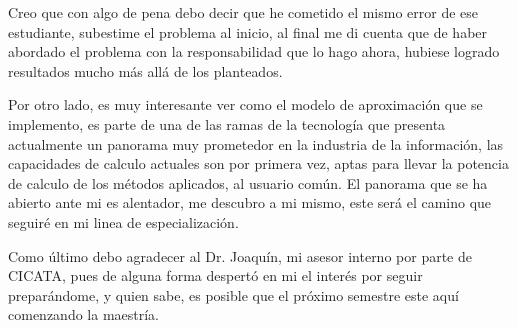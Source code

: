 \documentclass[12pt]{book} %
\begin{document}
	Creo que con algo de pena debo decir que he cometido el mismo error de ese estudiante, subestime el problema al inicio, al final me di cuenta 
	que de haber abordado el problema con la responsabilidad que lo hago ahora, hubiese logrado resultados mucho más allá de los planteados.
	
	Por otro lado, es muy interesante ver como el modelo de aproximación que se implemento, es parte de una de las ramas de la tecnología que 
	presenta actualmente un panorama muy prometedor en la industria de la información, las capacidades de calculo actuales son por primera vez, aptas
	para llevar la potencia de calculo de los métodos aplicados, al usuario común.
	El panorama que se ha abierto ante mi es alentador, me descubro a mi mismo, este será el camino que seguiré en mi linea de especialización.
	
	Como último debo agradecer al Dr. Joaquín, mi asesor interno por parte de CICATA, pues de alguna forma despertó en mi el interés por seguir 
	preparándome, y quien sabe, es posible que el próximo semestre este aquí comenzando la maestría.
	


			

\newpage

\newpage
\printnoidxglossaries
{}
\end{document}
